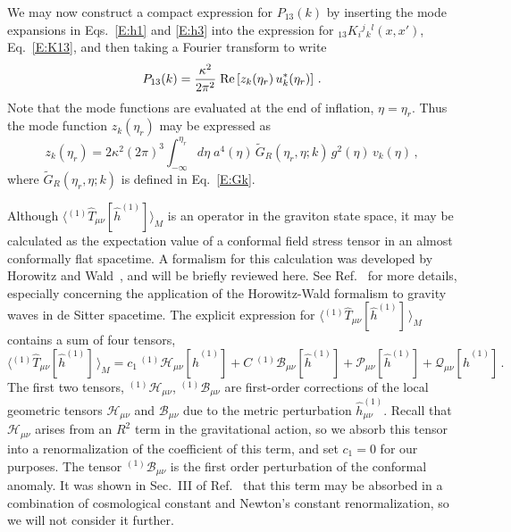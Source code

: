 \documentclass[preprint,prd,showpacs,superscriptaddress]{revtex4}
\begin{document}
 
 We may now construct a compact expression for $P_{13}(k)$ by inserting the mode expansions in Eqs.~\eqref{E:h1} and
 \eqref{E:h3} into the expression for ${}_{13}K_{i}{}^{j}{}_{k}{}^{l}(x,x')$, Eq.~\eqref{E:K13}, and then taking a Fourier
 transform to write
 \begin{equation}
P_{13}(k) = \frac{\kappa^2}{2 \pi^2}\; {\rm Re} \left[ z_k(\eta_r)\, u^*_k(\eta_r) \right]\,.
\label{E:P13}
\end{equation}
Note that the mode functions are evaluated at the end of inflation, $\eta = \eta_r$. 
Thus the mode function $z_k(\eta_r)$ may be expressed as
\begin{equation}\label{E:zk}
	z_k(\eta_r) = 2\kappa^{2}(2\pi)^{3}  \int^{\eta_r}_{-\infty} d\eta \;a^{4}(\eta) \,\widetilde{G}_{R}(\eta_r,\eta;{k})\,
	g^{2}(\eta) \, v_{k}(\eta)\,,
\end{equation}
 where  $\widetilde{G}_{R}(\eta_r,\eta;{k})$ is defined in Eq.~\eqref{E:Gk}.
 
 Although $\langle   {}^{(1)}\hat{T}_{\mu\nu}[\hat{h}^{(1)}] \rangle_M$ is an operator in the graviton state space, it may be calculated
 as  the expectation value of a conformal field stress tensor in an almost conformally flat spacetime. A formalism for
 this calculation was developed by Horowitz and Wald~\cite{HW82}, and will be briefly reviewed here. See Ref.~\cite{HFLY10}
 for more details, especially concerning the application of the Horowitz-Wald formalism to gravity waves in de Sitter
 spacetime. 
 The explicit expression for $\langle{}^{(1)}\hat{T}_{\mu\nu}[\hat{h}^{(1)}]\,\rangle_M$ contains a sum of four tensors,
\begin{equation}\label{E:T1a}
	\langle{}^{(1)}\hat{T}_{\mu\nu}[\hat{h}^{(1)}]\,\rangle_M=c_{1}\,{}^{(1)}\mathcal{H}_{\mu\nu}[\hat{h}^{(1)}]+
	C\;{}^{(1)}\mathcal{B}_{\mu\nu}[\hat{h}^{(1)}]+\mathcal{P}_{\mu\nu}[\hat{h}^{(1)}]+\mathcal{Q}_{\mu\nu}[\hat{h}^{(1)}]\,.
\end{equation}
 The first two tensors, ${}^{(1)}\mathcal{H}_{\mu\nu}$, ${}^{(1)}\mathcal{B}_{\mu\nu}$ are first-order corrections of the local 
 geometric tensors $\mathcal{H}_{\mu\nu}$ and $\mathcal{B}_{\mu\nu}$ due to the metric perturbation $\hat{h}^{(1)}_{\mu\nu}$.
 Recall that $\mathcal{H}_{\mu\nu}$ arises from an $R^2$ term in the gravitational action, so we absorb this tensor into
 a renormalization of the coefficient of this term, and set $c_1=0$ for our purposes. The tensor ${}^{(1)}\mathcal{B}_{\mu\nu}$
 is the first order perturbation of the conformal anomaly. It was shown in Sec.~III of  Ref.~\cite{HFLY10} that this term may be
 absorbed in a combination of cosmological constant and Newton's constant renormalization, so we will not consider it further. 
  
\end{document}
